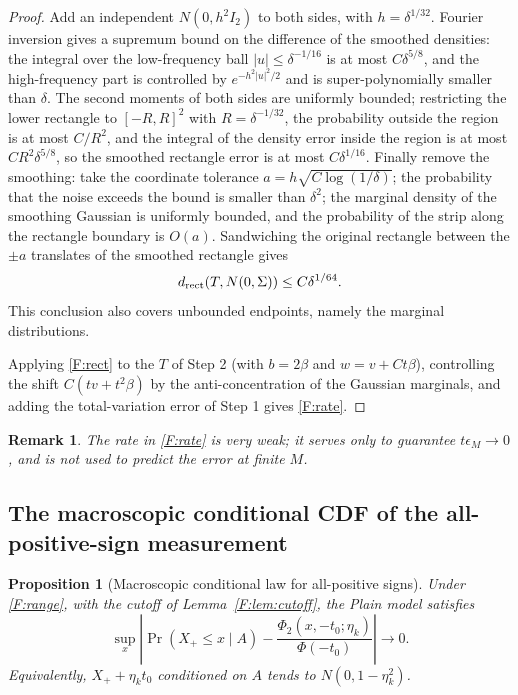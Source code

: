 \documentclass[a4paper,11pt]{article}
\newtheorem{proposition}[theorem]{Proposition}
\newtheorem{remark}[theorem]{Remark}
\numberwithin{equation}{section}
\begin{document}
\begin{proof}
Add an independent $N(0,h^2I_2)$ to both sides, with $h=\delta^{1/32}$. Fourier inversion gives a supremum
bound on the difference of the smoothed densities: the integral over the low-frequency ball
$|u|\le\delta^{-1/16}$ is at most $C\delta^{5/8}$, and the high-frequency part is controlled by
$e^{-h^2|u|^2/2}$ and is super-polynomially smaller than $\delta$. The second moments of both sides are
uniformly bounded; restricting the lower rectangle to $[-R,R]^2$ with $R=\delta^{-1/32}$, the probability
outside the region is at most $C/R^2$, and the integral of the density error inside the region is at most
$CR^2\delta^{5/8}$, so the smoothed rectangle error is at most $C\delta^{1/16}$. Finally remove the smoothing:
take the coordinate tolerance $a=h\sqrt{C\log(1/\delta)}$; the probability that the noise exceeds the bound is
smaller than $\delta^2$; the marginal density of the smoothing Gaussian is uniformly bounded, and the
probability of the strip along the rectangle boundary is $O(a)$. Sandwiching the original rectangle between
the $\pm a$ translates of the smoothed rectangle gives
\begin{equation}
d_{\rm rect}(T,N(0,\Sigma))\le C\delta^{1/64}.\label{F:rect}
\end{equation}
This conclusion also covers unbounded endpoints, namely the marginal distributions.

Applying \eqref{F:rect} to the $T$ of Step 2 (with $b=2\beta$ and $w=v+Ct\beta$), controlling the shift
$C(tv+t^2\beta)$ by the anti-concentration of the Gaussian marginals, and adding the total-variation error of
Step 1 gives \eqref{F:rate}.
\end{proof}

\begin{remark}
The rate in \eqref{F:rate} is very weak; it serves only to guarantee $t\epsilon_M\to0$, and is not used to
predict the error at finite $M$.
\end{remark}

\subsection{The macroscopic conditional CDF of the all-positive-sign measurement}

\begin{proposition}[Macroscopic conditional law for all-positive signs]\label{F:prop:cdf}
Under \eqref{F:range}, with the cutoff of Lemma~\ref{F:lem:cutoff}, the Plain model satisfies
\begin{equation}
\sup_x\left|\Pr(X_+\le x\mid A)-\frac{\Phi_2(x,-t_0;\eta_k)}{\Phi(-t_0)}\right|\to0.\label{F:cdf}
\end{equation}
Equivalently, $X_++\eta_kt_0$ conditioned on $A$ tends to $N(0,1-\eta_k^2)$.
\end{proposition}
\end{document}

